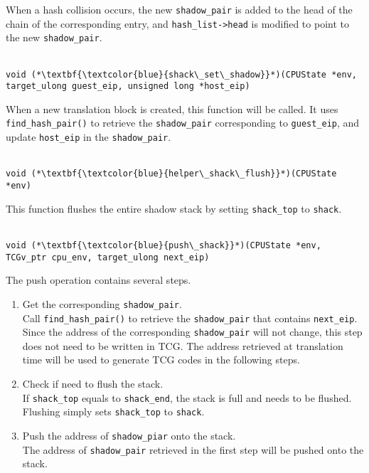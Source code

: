 \documentclass[12pt]{article}
\begin{document}
        When a hash collision occurs, the new \verb|shadow_pair| is added to the head of the chain of the corresponding entry,
        and \verb|hash_list->head| is modified to point to the new \verb|shadow_pair|.
        \\\\
        \begin{lstlisting}[style=Function] 
            void (*\textbf{\textcolor{blue}{shack\_set\_shadow}}*)(CPUState *env, target_ulong guest_eip, unsigned long *host_eip)
        \end{lstlisting}
        When a new translation block is created, this function will be called.
        It uses \verb|find_hash_pair()| to retrieve the \verb|shadow_pair| corresponding to \verb|guest_eip|, 
        and update \verb|host_eip| in the \verb|shadow_pair|.
        \\\\
        \begin{lstlisting}[style=Function] 
            void (*\textbf{\textcolor{blue}{helper\_shack\_flush}}*)(CPUState *env)
        \end{lstlisting}
        This function flushes the entire shadow stack by setting \verb|shack_top| to \verb|shack|.
        \\\\
        \begin{lstlisting}[style=Function] 
            void (*\textbf{\textcolor{blue}{push\_shack}}*)(CPUState *env, TCGv_ptr cpu_env, target_ulong next_eip)
        \end{lstlisting}
        The push operation contains several steps.
        \begin{enumerate}
            \item Get the corresponding \verb|shadow_pair|. \\
                Call \verb|find_hash_pair()| to retrieve the \verb|shadow_pair| that contains \verb|next_eip|.
                Since the address of the corresponding \verb|shadow_pair| will not change,
                this step does not need to be written in TCG.
                The address retrieved at translation time will be used to generate TCG codes in the following steps.

            \item Check if need to flush the stack. \\
                If \verb|shack_top| equals to \verb|shack_end|, the stack is full and needs to be flushed.
                Flushing simply sets \verb|shack_top| to \verb|shack|.

            \item Push the address of \verb|shadow_piar| onto the stack. \\
                The address of \verb|shadow_pair| retrieved in the first step will be pushed onto the stack.
        \end{enumerate}
\end{document}
